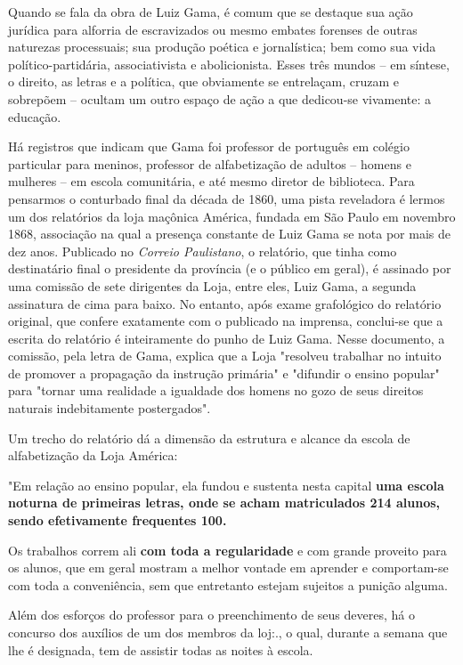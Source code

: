 Quando se fala da obra de Luiz Gama, é comum que se destaque sua ação
jurídica para alforria de escravizados ou mesmo embates forenses de
outras naturezas processuais; sua produção poética e jornalística; bem
como sua vida político-partidária, associativista e abolicionista. Esses
três mundos -- em síntese, o direito, as letras e a política, que
obviamente se entrelaçam, cruzam e sobrepõem -- ocultam um outro espaço
de ação a que dedicou-se vivamente: a educação.

Há registros que indicam que Gama foi professor de português em colégio
particular para meninos, professor de alfabetização de adultos -- homens
e mulheres -- em escola comunitária, e até mesmo diretor de biblioteca.
Para pensarmos o conturbado final da década de 1860, uma pista
reveladora é lermos um dos relatórios da loja maçônica América, fundada
em São Paulo em novembro 1868, associação na qual a presença constante
de Luiz Gama se nota por mais de dez anos. Publicado no \emph{Correio
Paulistano}, o relatório, que tinha como destinatário final o presidente
da província (e o público em geral), é assinado por uma comissão de sete
dirigentes da Loja, entre eles, Luiz Gama, a segunda assinatura de cima
para baixo. No entanto, após exame grafológico do relatório original,
que confere exatamente com o publicado na imprensa, conclui-se que a
escrita do relatório é inteiramente do punho de Luiz Gama. Nesse
documento, a comissão, pela letra de Gama, explica que a Loja "resolveu
trabalhar no intuito de promover a propagação da instrução primária" e
"difundir o ensino popular" para "tornar uma realidade a igualdade dos
homens no gozo de seus direitos naturais indebitamente postergados".

Um trecho do relatório dá a dimensão da estrutura e alcance da escola de
alfabetização da Loja América:

"Em relação ao ensino popular, ela fundou e sustenta nesta capital
\textbf{uma escola noturna de primeiras letras, onde se acham
matriculados 214 alunos, sendo efetivamente frequentes 100.}

Os trabalhos correm ali \textbf{com toda a regularidade} e com grande
proveito para os alunos, que em geral mostram a melhor vontade em
aprender e comportam-se com toda a conveniência, sem que entretanto
estejam sujeitos a punição alguma.

Além dos esforços do professor para o preenchimento de seus deveres, há
o concurso dos auxílios de um dos membros da loj:., o qual, durante a
semana que lhe é designada, tem de assistir todas as noites à escola.

